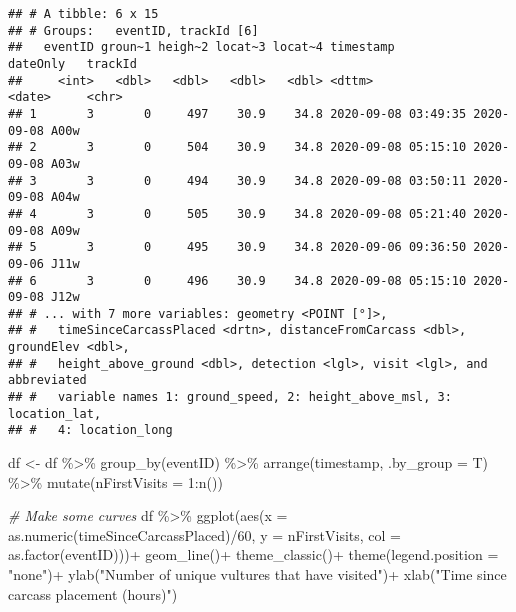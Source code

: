 \documentclass[
]{article}
\newenvironment{Shaded}{\begin{snugshade}}{\end{snugshade}}
\newcommand{\AttributeTok}[1]{\textcolor[rgb]{0.77,0.63,0.00}{#1}}
\newcommand{\CommentTok}[1]{\textcolor[rgb]{0.56,0.35,0.01}{\textit{#1}}}
\newcommand{\DecValTok}[1]{\textcolor[rgb]{0.00,0.00,0.81}{#1}}
\newcommand{\FunctionTok}[1]{\textcolor[rgb]{0.00,0.00,0.00}{#1}}
\newcommand{\NormalTok}[1]{#1}
\newcommand{\OtherTok}[1]{\textcolor[rgb]{0.56,0.35,0.01}{#1}}
\newcommand{\SpecialCharTok}[1]{\textcolor[rgb]{0.00,0.00,0.00}{#1}}
\newcommand{\StringTok}[1]{\textcolor[rgb]{0.31,0.60,0.02}{#1}}
\begin{document}
\begin{verbatim}
## # A tibble: 6 x 15
## # Groups:   eventID, trackId [6]
##   eventID groun~1 heigh~2 locat~3 locat~4 timestamp           dateOnly   trackId
##     <int>   <dbl>   <dbl>   <dbl>   <dbl> <dttm>              <date>     <chr>  
## 1       3       0     497    30.9    34.8 2020-09-08 03:49:35 2020-09-08 A00w   
## 2       3       0     504    30.9    34.8 2020-09-08 05:15:10 2020-09-08 A03w   
## 3       3       0     494    30.9    34.8 2020-09-08 03:50:11 2020-09-08 A04w   
## 4       3       0     505    30.9    34.8 2020-09-08 05:21:40 2020-09-08 A09w   
## 5       3       0     495    30.9    34.8 2020-09-06 09:36:50 2020-09-06 J11w   
## 6       3       0     496    30.9    34.8 2020-09-08 05:15:10 2020-09-08 J12w   
## # ... with 7 more variables: geometry <POINT [°]>,
## #   timeSinceCarcassPlaced <drtn>, distanceFromCarcass <dbl>, groundElev <dbl>,
## #   height_above_ground <dbl>, detection <lgl>, visit <lgl>, and abbreviated
## #   variable names 1: ground_speed, 2: height_above_msl, 3: location_lat,
## #   4: location_long
\end{verbatim}

\begin{Shaded}
\begin{Highlighting}[]
\NormalTok{df }\OtherTok{\textless{}{-}}\NormalTok{ df }\SpecialCharTok{\%\textgreater{}\%}
  \FunctionTok{group\_by}\NormalTok{(eventID) }\SpecialCharTok{\%\textgreater{}\%}
  \FunctionTok{arrange}\NormalTok{(timestamp, }\AttributeTok{.by\_group =}\NormalTok{ T) }\SpecialCharTok{\%\textgreater{}\%}
  \FunctionTok{mutate}\NormalTok{(}\AttributeTok{nFirstVisits =} \DecValTok{1}\SpecialCharTok{:}\FunctionTok{n}\NormalTok{())}

\CommentTok{\# Make some curves}
\NormalTok{df }\SpecialCharTok{\%\textgreater{}\%}
  \FunctionTok{ggplot}\NormalTok{(}\FunctionTok{aes}\NormalTok{(}\AttributeTok{x =} \FunctionTok{as.numeric}\NormalTok{(timeSinceCarcassPlaced)}\SpecialCharTok{/}\DecValTok{60}\NormalTok{, }\AttributeTok{y =}\NormalTok{ nFirstVisits, }\AttributeTok{col =} \FunctionTok{as.factor}\NormalTok{(eventID)))}\SpecialCharTok{+}       \FunctionTok{geom\_line}\NormalTok{()}\SpecialCharTok{+}
  \FunctionTok{theme\_classic}\NormalTok{()}\SpecialCharTok{+}
  \FunctionTok{theme}\NormalTok{(}\AttributeTok{legend.position =} \StringTok{"none"}\NormalTok{)}\SpecialCharTok{+}
  \FunctionTok{ylab}\NormalTok{(}\StringTok{"Number of unique vultures that have visited"}\NormalTok{)}\SpecialCharTok{+}
  \FunctionTok{xlab}\NormalTok{(}\StringTok{"Time since carcass placement (hours)"}\NormalTok{)}
\end{Highlighting}
\end{Shaded}
\end{document}
